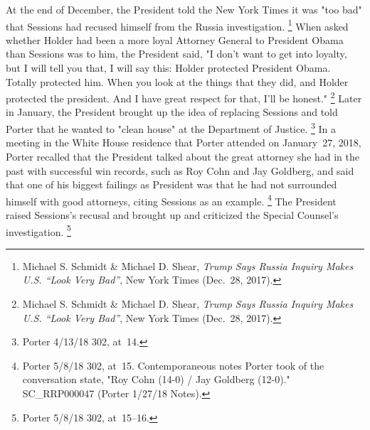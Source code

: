 At the end of December, the President told the New York Times it was "too bad" that Sessions had recused himself from the Russia investigation.%
\footnote{Michael S. Schmidt \& Michael D. Shear, \textit{Trump Says Russia Inquiry Makes U.S. ``Look Very Bad''}, New York Times (Dec.~28, 2017).}
When asked whether Holder had been a more loyal Attorney General to President Obama than Sessions was to him, the President said, "I don't want to get into loyalty, but I will tell you that, I will say this: Holder protected President Obama.
Totally protected him.
When you look at the things that they did, and Holder protected the president.
And I have great respect for that, I'll be honest."%
\footnote{Michael S. Schmidt \& Michael D. Shear, \textit{Trump Says Russia Inquiry Makes U.S. ``Look Very Bad''}, New York Times (Dec.~28, 2017).}
Later in January, the President brought up the idea of replacing Sessions and told Porter that he wanted to "clean house" at the Department of Justice.%
\footnote{Porter 4/13/18 302, at~14.}
In a meeting in the White House residence that Porter attended on January~27, 2018, Porter recalled that the President talked about the great attorney she had in the past with successful win records, such as Roy Cohn and Jay Goldberg, and said that one of his biggest failings as President was that he had not surrounded himself with good attorneys, citing Sessions as an example.%
\footnote{Porter 5/8/18 302, at~15.
Contemporaneous notes Porter took of the conversation state, "Roy Cohn (14-0) / Jay Goldberg (12-0)."
SC\_RRP000047 (Porter 1/27/18 Notes).}
The President raised Sessions's recusal and brought up and criticized the Special Counsel's investigation.%
\footnote{Porter 5/8/18 302, at~15--16.}


